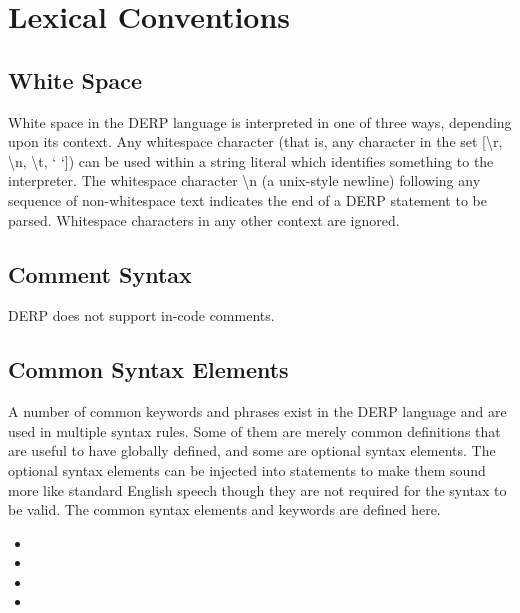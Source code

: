 \section{Lexical Conventions}

\subsection{White Space}
White space in the DERP language is interpreted in one of three ways,
depending upon its context. Any whitespace character (that is, any
character in the set [\textbackslash r, \textbackslash n, \textbackslash t, ‘ ‘]) can be used within a
string literal which identifies something to the interpreter.
The whitespace character \textbackslash n (a unix-style newline) following any sequence
of non-whitespace text indicates the end of a DERP statement to be parsed.
Whitespace characters in any other context are ignored.


\subsection{Comment Syntax}
DERP does not support in-code comments.

\subsection{Common Syntax Elements}
A number of common keywords and phrases exist in the DERP language and are
used in multiple syntax rules. Some of them are merely common definitions that
are useful to have globally defined, and some are optional syntax elements.
The optional syntax elements can be injected into statements to make them
sound more like standard English speech though they are not
required for the syntax to be valid. The common syntax elements and keywords
are defined here.

\begin{itemize}[leftmargin=1in]
    \item[\nonterminal{article}] \bnf{:}  \bnf{|}  \bnf{|} 
    \item[\nonterminal{string}] \bnf{:} 
    \item[\nonterminal{digit}] \bnf{:} \bnf{[0-9]}
    \item[\nonterminal{number}] \bnf{:} \bnf{+([.,]}   
\end{itemize}
